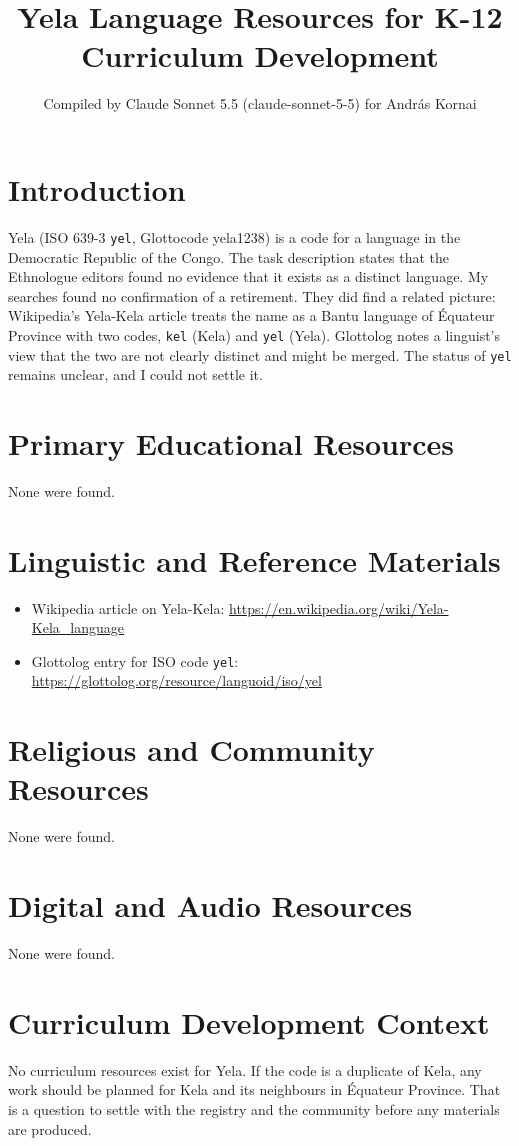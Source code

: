 \documentclass[12pt]{article}
\title{Yela Language Resources for K-12 Curriculum Development}
\author{Compiled by Claude Sonnet 5.5 (claude-sonnet-5-5) for Andr\'as Kornai}
\date{}
\begin{document}
\maketitle

\section{Introduction}
Yela (ISO 639-3 \texttt{yel}, Glottocode yela1238) is a code for a language in the Democratic Republic of the Congo. The task description states that the Ethnologue editors found no evidence that it exists as a distinct language. My searches found no confirmation of a retirement. They did find a related picture: Wikipedia's Yela-Kela article treats the name as a Bantu language of {\'E}quateur Province with two codes, \texttt{kel} (Kela) and \texttt{yel} (Yela). Glottolog notes a linguist's view that the two are not clearly distinct and might be merged. The status of \texttt{yel} remains unclear, and I could not settle it.

\section{Primary Educational Resources}
None were found.

\section{Linguistic and Reference Materials}
\begin{itemize}
\item Wikipedia article on Yela-Kela: \url{https://en.wikipedia.org/wiki/Yela-Kela_language}
\item Glottolog entry for ISO code \texttt{yel}: \url{https://glottolog.org/resource/languoid/iso/yel}
\end{itemize}

\section{Religious and Community Resources}
None were found.

\section{Digital and Audio Resources}
None were found.

\section{Curriculum Development Context}
No curriculum resources exist for Yela. If the code is a duplicate of Kela, any work should be planned for Kela and its neighbours in {\'E}quateur Province. That is a question to settle with the registry and the community before any materials are produced.
\end{document}
